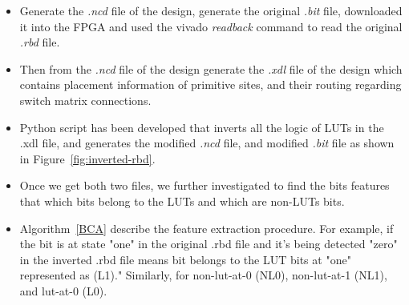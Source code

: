 \begin{itemize}

\item Generate the \textit{.ncd} file of the design, generate the original \textit{.bit} file, downloaded it into the FPGA and used the vivado \textit{readback} command to read the original \textit{.rbd} file.

\item Then from the \textit{.ncd} file of the design generate the \textit{.xdl} file of the design  which contains placement information of primitive sites, and their routing regarding switch matrix connections.

\item Python script has been developed that inverts all the logic of LUTs in the .xdl file, and generates the modified \textit{.ncd} file, and modified \textit{.bit} file as shown in Figure~\ref{fig:inverted-rbd}.

\item Once we get both two files, we further investigated to find the bits features that which bits belong to the LUTs and which are non-LUTs bits.

\item Algorithm~\ref{BCA} describe the feature extraction procedure. For example, if the bit is at state "one" in the original .rbd file and it's being detected "zero" in the inverted .rbd file means bit belongs to the LUT bits at "one" represented as (L1)." Similarly, for non-lut-at-0 (NL0), non-lut-at-1 (NL1), and lut-at-0 (L0). 

\end{itemize}


